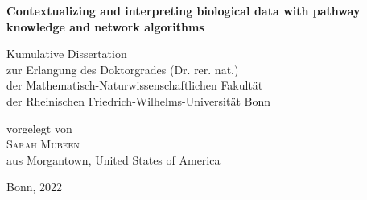 \begin{titlepage} %

    \begin{center}
        \fontsize{28}{36}\selectfont %

        \textbf{Contextualizing and interpreting biological data with pathway knowledge and network algorithms}
        
        \vspace{3.5cm} %
        \renewcommand{\baselinestretch}{1.5} %
        \large

        Kumulative Dissertation \\
        zur Erlangung des Doktorgrades (Dr. rer. nat.)\\
        der Mathematisch-Naturwissenschaftlichen Fakult\"at \\
        der Rheinischen Friedrich-Wilhelms-Universit\"at Bonn \\

        \vspace{2.0cm}
        \renewcommand{\baselinestretch}{1.1}

        vorgelegt von \\
        \textsc{Sarah Mubeen} \\
        aus Morgantown, United States of America \\

        \renewcommand{\baselinestretch}{1}
        \vspace{1.0cm}

        Bonn, 2022 \\
    \end{center}
\end{titlepage}

\newpage\null\newpage

